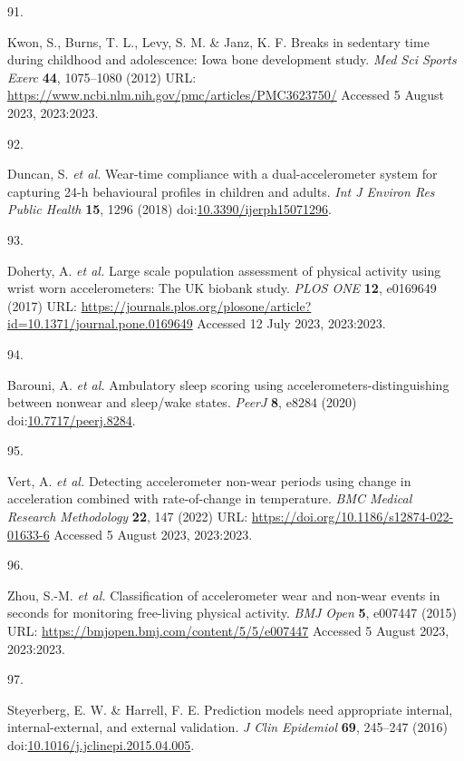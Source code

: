 \documentclass[
  9pt,
]{scrbook}
\newlength{\cslhangindent}
\newlength{\csllabelwidth}
\newlength{\cslentryspacingunit} %
\newenvironment{CSLReferences}[2] %
 {%
  \setlength{\parindent}{0pt}
  \ifodd #1
  \let\oldpar\par
  \def\par{\hangindent=\cslhangindent\oldpar}
  \fi
  \setlength{\parskip}{#2\cslentryspacingunit}
 }%
 {}
\newcommand{\CSLLeftMargin}[1]{\parbox[t]{\csllabelwidth}{#1}}
\newcommand{\CSLRightInline}[1]{\parbox[t]{\linewidth - \csllabelwidth}{#1}\break}
\begin{document}
\begin{CSLReferences}{0}{0}
\leavevmode{}%
\CSLLeftMargin{91. }%
\CSLRightInline{Kwon, S., Burns, T. L., Levy, S. M. \& Janz, K. F.
Breaks in sedentary time during childhood and adolescence: Iowa bone
development study. \emph{Med Sci Sports Exerc} \textbf{44}, 1075--1080
(2012) URL: \url{https://www.ncbi.nlm.nih.gov/pmc/articles/PMC3623750/}
Accessed 5 August 2023, 2023:2023.}

\leavevmode{}%
\CSLLeftMargin{92. }%
\CSLRightInline{Duncan, S. \emph{et al.} Wear-time compliance with a
dual-accelerometer system for capturing 24-h behavioural profiles in
children and adults. \emph{Int J Environ Res Public Health} \textbf{15},
1296 (2018)
doi:\href{https://doi.org/10.3390/ijerph15071296}{10.3390/ijerph15071296}.}

\leavevmode{}%
\CSLLeftMargin{93. }%
\CSLRightInline{Doherty, A. \emph{et al.} Large scale population
assessment of physical activity using wrist worn accelerometers: The
{UK} biobank study. \emph{{PLOS} {ONE}} \textbf{12}, e0169649 (2017)
URL:
\url{https://journals.plos.org/plosone/article?id=10.1371/journal.pone.0169649}
Accessed 12 July 2023, 2023:2023.}

\leavevmode{}%
\CSLLeftMargin{94. }%
\CSLRightInline{Barouni, A. \emph{et al.} Ambulatory sleep scoring using
accelerometers-distinguishing between nonwear and sleep/wake states.
\emph{{PeerJ}} \textbf{8}, e8284 (2020)
doi:\href{https://doi.org/10.7717/peerj.8284}{10.7717/peerj.8284}.}

\leavevmode{}%
\CSLLeftMargin{95. }%
\CSLRightInline{Vert, A. \emph{et al.} Detecting accelerometer non-wear
periods using change in acceleration combined with rate-of-change in
temperature. \emph{{BMC} Medical Research Methodology} \textbf{22}, 147
(2022) URL: \url{https://doi.org/10.1186/s12874-022-01633-6} Accessed 5
August 2023, 2023:2023.}

\leavevmode{}%
\CSLLeftMargin{96. }%
\CSLRightInline{Zhou, S.-M. \emph{et al.} Classification of
accelerometer wear and non-wear events in seconds for monitoring
free-living physical activity. \emph{{BMJ} Open} \textbf{5}, e007447
(2015) URL: \url{https://bmjopen.bmj.com/content/5/5/e007447} Accessed 5
August 2023, 2023:2023.}

\leavevmode{}%
\CSLLeftMargin{97. }%
\CSLRightInline{Steyerberg, E. W. \& Harrell, F. E. Prediction models
need appropriate internal, internal-external, and external validation.
\emph{J Clin Epidemiol} \textbf{69}, 245--247 (2016)
doi:\href{https://doi.org/10.1016/j.jclinepi.2015.04.005}{10.1016/j.jclinepi.2015.04.005}.}


\end{CSLReferences}
\end{document}

